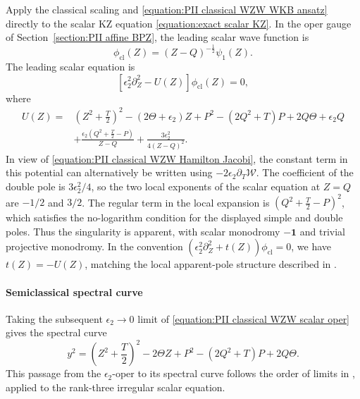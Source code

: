 \documentclass[a4paper,11pt]{article}
\numberwithin{equation}{section}
\begin{document}
Apply the classical scaling and
\eqref{equation:PII classical WZW WKB ansatz} directly to the scalar
KZ equation \eqref{equation:exact scalar KZ}.  In the oper gauge of
Section~\ref{section:PII affine BPZ}, the leading scalar wave function is
\begin{equation}
	\phi_{\mathrm{cl}}(Z)=(Z-Q)^{-\frac{1}{2}}\psi_{1}(Z).
\end{equation}
The leading scalar equation is
\begin{equation}
	\label{equation:PII classical WZW scalar oper}
	\left[\epsilon_{2}^{2}\partial_{Z}^{2}-U(Z)\right]\phi_{\mathrm{cl}}(Z)=0,
\end{equation}
where
\begin{equation}
	\label{equation:PII classical WZW oper potential}
	\begin{aligned}
		U(Z)={}&\left(Z^{2}+\frac{T}{2}\right)^{2}
		-(2\Theta+\epsilon_{2})Z
		+P^{2}-(2Q^{2}+T)P+2Q\Theta+\epsilon_{2}Q\\
		&+\frac{\epsilon_{2}\left(Q^{2}+\frac{T}{2}-P\right)}{Z-Q}
		+\frac{3\epsilon_{2}^{2}}{4(Z-Q)^{2}}.
	\end{aligned}
\end{equation}
In view of \eqref{equation:PII classical WZW Hamilton Jacobi}, the
constant term in this potential can alternatively be written using
$-2\epsilon_{2}\partial_{T}\mathcal{W}$.  The coefficient of the double
pole is $3\epsilon_{2}^{2}/4$, so the two local exponents of the scalar
equation at $Z=Q$ are $-1/2$ and $3/2$.  The regular term in the
local expansion is $\left(Q^{2}+\frac{T}{2}-P\right)^{2}$, which
satisfies the no-logarithm condition for the displayed simple and
double poles.  Thus the singularity is apparent, with scalar
monodromy $-\mathbf{1}$ and trivial projective monodromy.  In the convention
$\left(\epsilon_{2}^{2}\partial_{Z}^{2}+t(Z)\right)\phi_{\mathrm{cl}}=0$, we have
$t(Z)=-U(Z)$, matching the local apparent-pole structure described in
\cite[Eq.~(D.15)]{FrenkelGukovTeschner2015}.


\paragraph{Semiclassical spectral curve}

Taking the subsequent $\epsilon_{2}\to0$ limit of
\eqref{equation:PII classical WZW scalar oper} gives the spectral curve
\begin{equation}
	\label{equation:PII classical WZW subsequent spectral curve}
	y^{2}=
	\left(Z^{2}+\frac{T}{2}\right)^{2}-2\Theta Z
	+P^{2}-(2Q^{2}+T)P+2Q\Theta.
\end{equation}
This passage from the
$\epsilon_{2}$-oper to its spectral curve follows the order
of limits in \cite[Appendix~D.4]{FrenkelGukovTeschner2015},
applied to the rank-three irregular scalar equation.
\end{document}
